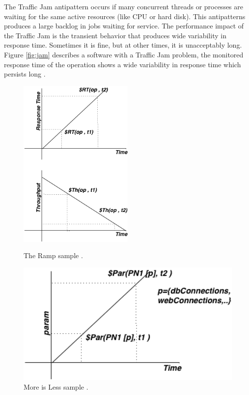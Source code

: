 \documentclass[times]{stvrauth}
\begin{document}
The Traffic Jam antipattern occurs if many concurrent threads or processes are waiting for the same  active resources (like CPU or hard disk). This antipatterns produces a large backlog in jobs waiting for service. The performance impact of the Traffic Jam is the transient behavior that produces wide variability in response time. Sometimes it is fine, but at other times, it is unacceptably long. Figure \ref{fig:jam} describes a software with a Traffic Jam problem, the monitored response time of the operation shows a wide variability in response time which persists long \cite{Vetoio2011}. 


\begin{figure}[H]
\begin{minipage}{.5\textwidth}
\centering
\includegraphics[width=0.5\textwidth]{./images/ramp.png}
\caption{The Ramp sample \cite{Vetoio2011}.}
\label{fig:ramp}
\end{minipage}
\begin{minipage}{.5\textwidth}
\centering
\includegraphics[width=1\textwidth]{./images/moreisless.png}
\caption{More is Less sample \cite{Vetoio2011}.}
\label{fig:moreisless}
\end{minipage}
\end{figure}
\end{document}
